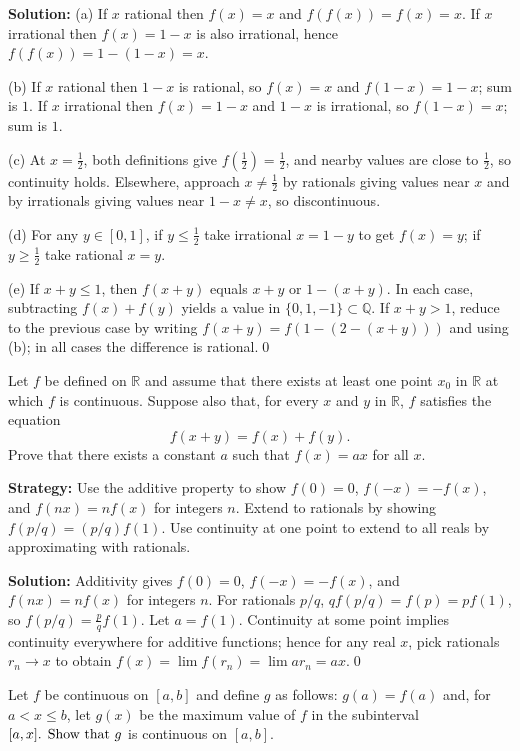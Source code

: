 \bigskip\noindent\textbf{Solution:}
(a) If $x$ rational then $f(x)=x$ and $f(f(x))=f(x)=x$. If $x$ irrational then $f(x)=1-x$ is also irrational, hence $f(f(x))=1-(1-x)=x$.

(b) If $x$ rational then $1-x$ is rational, so $f(x)=x$ and $f(1-x)=1-x$; sum is $1$. If $x$ irrational then $f(x)=1-x$ and $1-x$ is irrational, so $f(1-x)=x$; sum is $1$.

(c) At $x=\tfrac12$, both definitions give $f(\tfrac12)=\tfrac12$, and nearby values are close to $\tfrac12$, so continuity holds. Elsewhere, approach $x\ne\tfrac12$ by rationals giving values near $x$ and by irrationals giving values near $1-x\ne x$, so discontinuous.

(d) For any $y\in[0,1]$, if $y\le \tfrac12$ take irrational $x=1-y$ to get $f(x)=y$; if $y\ge \tfrac12$ take rational $x=y$.

(e) If $x+y\le 1$, then $f(x+y)$ equals $x+y$ or $1-(x+y)$. In each case, subtracting $f(x)+f(y)$ yields a value in $\{0,1,-1\}\subset \mathbb{Q}$. If $x+y>1$, reduce to the previous case by writing $f(x+y)=f(1-(2-(x+y)))$ and using (b); in all cases the difference is rational.\qed



\begin{problembox}
Let \( f \) be defined on \( \mathbb{R} \) and assume that there exists at least one point \( x_0 \) in \( \mathbb{R} \) at which \( f \) is continuous. Suppose also that, for every \( x \) and \( y \) in \( \mathbb{R} \), \( f \) satisfies the equation
\[f(x + y) = f(x) + f(y).\]
Prove that there exists a constant \( a \) such that \( f(x) = ax \) for all \( x \).
\end{problembox}

\noindent\textbf{Strategy:} Use the additive property to show $f(0) = 0$, $f(-x) = -f(x)$, and $f(nx) = nf(x)$ for integers $n$. Extend to rationals by showing $f(p/q) = (p/q)f(1)$. Use continuity at one point to extend to all reals by approximating with rationals.

\bigskip\noindent\textbf{Solution:}
Additivity gives $f(0)=0$, $f(-x)=-f(x)$, and $f(nx)=nf(x)$ for integers $n$. For rationals $p/q$, $qf(p/q)=f(p)=pf(1)$, so $f(p/q)=\tfrac{p}{q}f(1)$. Let $a=f(1)$. Continuity at some point implies continuity everywhere for additive functions; hence for any real $x$, pick rationals $r_n\to x$ to obtain $f(x)=\lim f(r_n)=\lim ar_n=ax$.\qed



\begin{problembox}
Let \( f \) be continuous on \([a, b]\) and define \( g \) as follows: \( g(a) = f(a) \) and, for \( a < x \leq b \), let \( g(x) \) be the maximum value of \( f \) in the subinterval \([a, x]$. Show that \( g \) is continuous on \([a, b]\).
\end{problembox}

